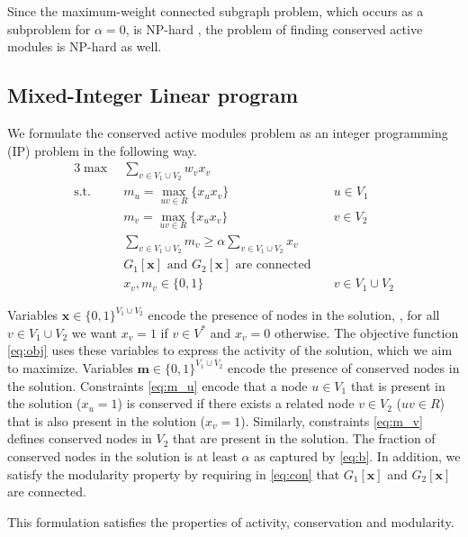 		Since the maximum-weight connected subgraph problem, which occurs as a
		subproblem for $\alpha = 0$, is NP-hard \cite{johnson1985np}, the problem of
		finding conserved active modules is NP-hard as well.

	\subsection{Mixed-Integer Linear program}

		We formulate the conserved active modules problem as an integer programming (IP)
		problem in the following way.
		\allowdisplaybreaks
		\begin{alignat}{3}
		\label{eq:obj}  \max\: & \sum_{v \in V_1 \cup V_2} w_v x_v \\
		\label{eq:m_u}  \text{s.t.}\:\: & m_u = \max_{uv \in R} \{ x_u x_v \} & u \in V_1\\
		\label{eq:m_v}            & m_v = \max_{uv \in R} \{ x_u x_v \} & v \in V_2\\
		\label{eq:b}              & \sum_{v \in V_1 \cup V_2} m_v \geq \alpha \sum_{v \in V_1 \cup V_2} x_v &\\
		\label{eq:con}  & \text{$G_1[\mathbf{x}]$ and $G_2[\mathbf{x}]$ are connected}\quad&\\
		\label{eq:vars} & x_v, m_v \in \{0,1\} & v \in V_1 \cup V_2
		\end{alignat}

		Variables $\mathbf{x} \in \{0, 1\}^{V_1 \cup V_2}$
		encode the presence of nodes in the solution, \ie, for all $v \in V_1 \cup
		V_2$ we want $x_v = 1$ if $v \in V^*$ and $x_v = 0$ otherwise. The objective
		function \eqref{eq:obj} uses these variables to express the activity of the
		solution, which we aim to maximize. Variables $\mathbf{m} \in \{0, 1\}^{V_1 \cup V_2}$
		encode the presence of conserved nodes in the solution. Constraints
		\eqref{eq:m_u} encode that a node $u \in V_1$ that is present in the
		solution ($x_u = 1$) is conserved if there exists a related node $v
		\in V_2$ ($uv \in R$) that is also present in the solution ($x_v =
		1$). Similarly, constraints \eqref{eq:m_v} defines conserved nodes in
		$V_2$ that are present in the solution. The fraction of conserved
		nodes in the solution is at least $\alpha$ as captured by
		\eqref{eq:b}. In addition, we satisfy the modularity property by requiring in \eqref{eq:con} that $G_1[\mathbf{x}]$ and $G_2[\mathbf{x}]$ are connected. 

		This formulation satisfies the properties of activity, conservation and modularity.

